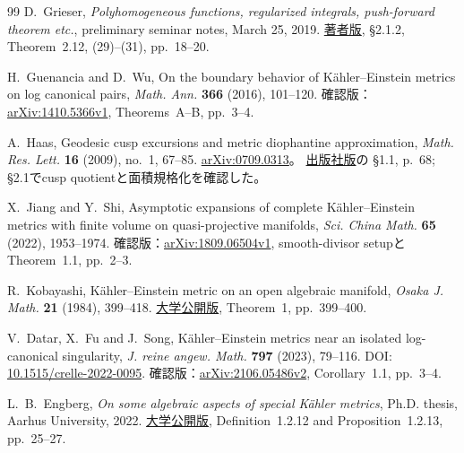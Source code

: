 \documentclass[11pt,a4paper]{ltjsarticle}
\theoremstyle{plain}
\theoremstyle{definition}
\theoremstyle{remark}
\begin{document}
\begin{thebibliography}{99}
D.~Grieser,
\newblock \emph{Polyhomogeneous functions, regularized integrals, push-forward theorem etc.},
\newblock preliminary seminar notes, March 25, 2019.
\newblock \href{https://uol.de/f/5/inst/mathe/personen/daniel.grieser/Lehre/Singular_Analysis_2020/literature/Gri_phg-fcns_2019_03_25.pdf}{著者版},
\S2.1.2, Theorem~2.12, (29)--(31), pp.~18--20.

H.~Guenancia and D.~Wu,
\newblock On the boundary behavior of K\"ahler--Einstein metrics on log canonical pairs,
\newblock \emph{Math. Ann.} \textbf{366} (2016), 101--120.
\newblock 確認版：\href{https://arxiv.org/abs/1410.5366v1}{arXiv:1410.5366v1},
Theorems~A--B, pp.~3--4.

A.~Haas,
\newblock Geodesic cusp excursions and metric diophantine approximation,
\newblock \emph{Math. Res. Lett.} \textbf{16} (2009), no.~1, 67--85.
\newblock \href{https://arxiv.org/abs/0709.0313}{arXiv:0709.0313}。
\href{https://intlpress.com/api/bgcloud-front/resource/pdf/volume/1806604938178359298-1806604938178359298-47d35ef29e172eaacb043bc0cbef26f3.pdf}{出版社版}の
\S1.1, p.~68; \S2.1でcusp quotientと面積規格化を確認した。

X.~Jiang and Y.~Shi,
\newblock Asymptotic expansions of complete K\"ahler--Einstein metrics with finite volume on quasi-projective manifolds,
\newblock \emph{Sci. China Math.} \textbf{65} (2022), 1953--1974.
\newblock 確認版：\href{https://arxiv.org/abs/1809.06504v1}{arXiv:1809.06504v1},
smooth-divisor setupとTheorem~1.1, pp.~2--3.

R.~Kobayashi,
\newblock K\"ahler--Einstein metric on an open algebraic manifold,
\newblock \emph{Osaka J. Math.} \textbf{21} (1984), 399--418.
\newblock \href{https://ir.library.osaka-u.ac.jp/repo/ouka/all/6442/ojm21_02_12.pdf}{大学公開版},
Theorem~1, pp.~399--400.

V.~Datar, X.~Fu and J.~Song,
\newblock K\"ahler--Einstein metrics near an isolated log-canonical singularity,
\newblock \emph{J. reine angew. Math.} \textbf{797} (2023), 79--116.
\newblock DOI: \href{https://doi.org/10.1515/crelle-2022-0095}{10.1515/crelle-2022-0095}.
\newblock 確認版：\href{https://arxiv.org/abs/2106.05486v2}{arXiv:2106.05486v2},
Corollary~1.1, pp.~3--4.

L.~B.~Engberg,
\newblock \emph{On some algebraic aspects of special K\"ahler metrics},
\newblock Ph.D. thesis, Aarhus University, 2022.
\newblock \href{https://data.math.au.dk/publications/phd/2022/math-phd-2022-lbe.pdf}{大学公開版},
Definition~1.2.12 and Proposition~1.2.13, pp.~25--27.


\end{thebibliography}
\end{document}
